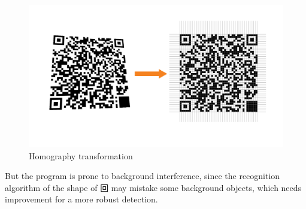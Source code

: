 \documentclass[10pt]{article}
\begin{document}
\begin{figure}[H]
  \centering
  \includegraphics[width=\linewidth]{pic-01.png}
  \caption{Homography transformation}
\end{figure}


But the program is prone to background interference, since the recognition algorithm of the 
shape of 回 may mistake some background objects, which needs improvement for a more robust
detection.
\end{document}
